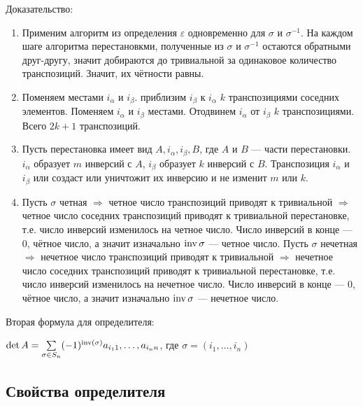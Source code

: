 Доказательство:

\begin{enumerate}
    \item Применим алгоритм из определения \(\varepsilon\) одновременно для \(\sigma\) и \(\sigma^{-1}\). На каждом шаге алгоритма перестановкми, полученные из \(\sigma\) и \(\sigma^{-1}\) остаются обратными друг-другу, значит добираются до тривиальной за одинаковое количество транспозиций. Значит, их чётности равны.
    \item Поменяем местами \(i_\alpha\) и \(i_\beta\). приблизим \(i_\beta\) к \(i_\alpha\) \(k\) транспозициями соседних элементов. Поменяем \(i_\alpha\) и \(i_\beta\) местами. Отодвинем \(i_\alpha\) от \(i_\beta\) \(k\) транспозициями. Всего \(2k + 1\) транспозиций.
    \item Пусть перестановка имеет вид \(A, i_\alpha, i_\beta, B\), где \(A\) и \(B\) --- части перестановки. \(i_\alpha\) образует \(m\) инверсий с \(A\), \(i_\beta\) образует \(k\) инверсий с \(B\). Транспозиция  \(i_\alpha\) и \(i_\beta\) или создаст или уничтожит их инверсию и не изменит \(m\) или \(k\).
    \item  Пусть \(\sigma\) четная \(\Rightarrow\) четное число транспозиций приводят к тривиальной \(\Rightarrow\) четное число соседних транспозиций приводят к тривиальной перестановке, т.е. число инверсий изменилось на четное число. Число инверсий в конце --- 0, чётное число, а значит изначально \(\operatorname{inv} \sigma\) --- четное число. Пусть \(\sigma\) нечетная \(\Rightarrow\) нечетное число транспозиций приводят к тривиальной \(\Rightarrow\) нечетное число соседних транспозиций приводят к тривиальной перестановке, т.е. число инверсий изменилось на нечетное число. Число инверсий в конце --- 0, чётное число, а значит изначально \(\operatorname{inv} \sigma\) --- нечетное число.
\end{enumerate}

Вторая формула для определителя:

\(\det A = \sum\limits_{\sigma \in S_n} (-1)^{\operatorname{inv}(\sigma)} a_{i_1 1}, \ldots, a_{i_n n}\), где \(\sigma = (i_1, \ldots, i_n)\)

\subsection{Свойства определителя}

